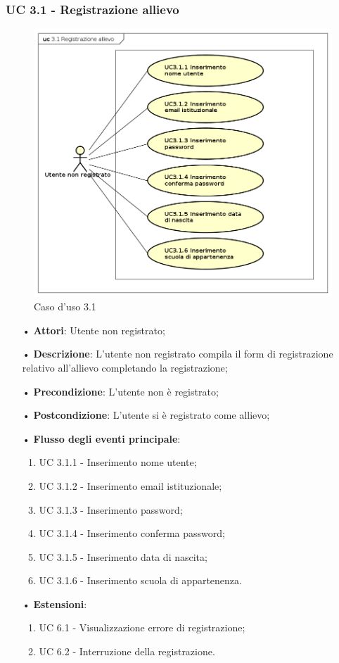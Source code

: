 \subsubsection{UC 3.1 - Registrazione allievo}
\begin{figure}[H]
\centering
\includegraphics[width=17cm]{img/UC31.png} 
\caption{Caso d'uso 3.1}\label{fig:31}
\end{figure}
\begin{itemize}
\item[•]\textbf{Attori}: Utente non registrato;
\item[•]\textbf{Descrizione}: L’utente non registrato compila il form di registrazione relativo all’allievo completando la registrazione;
\item[•]\textbf{Precondizione}: L’utente non è registrato;
\item[•]\textbf{Postcondizione}: L’utente si è registrato come allievo;
\item[•]\textbf{Flusso degli eventi principale}:
\begin{enumerate}
\item UC 3.1.1 - Inserimento nome utente;
\item UC 3.1.2 - Inserimento email istituzionale;
\item UC 3.1.3 - Inserimento password;
\item UC 3.1.4 - Inserimento conferma password;
\item UC 3.1.5 - Inserimento data di nascita;
\item UC 3.1.6 - Inserimento scuola di appartenenza.
\end{enumerate}
\item[•]\textbf{Estensioni}:
\begin{enumerate}
\item UC 6.1 - Visualizzazione errore di registrazione;
\item UC 6.2 - Interruzione della registrazione.
\end{enumerate}
\end{itemize}

